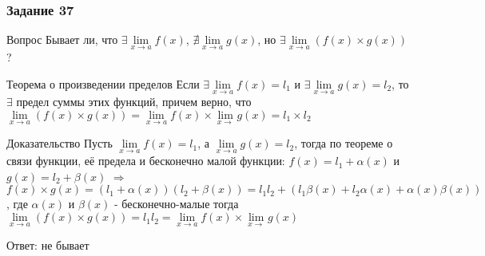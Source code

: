 \documentclass[8pt]{beamer}
\begin{document}
  \begin{frame}
    \frametitle{Задание 37}

    \begin{block}{Вопрос}
      Бывает ли, что $\exists \lim\limits_{x \rightarrow a}f(x)$, $\nexists \lim\limits_{x \rightarrow a}g(x)$,
      но $\exists \lim\limits_{x \rightarrow a}(f(x) \times g(x))$?
    \end{block} \pause

    \begin{alertblock}{Теорема о произведении пределов}
      Если $\exists \lim\limits_{x \rightarrow a}f(x) = l_1$ и $\exists \lim\limits_{x \rightarrow a}g(x) = l_2$,
      то $\exists$ предел суммы этих функций, причем верно, что
      $\lim\limits_{x \rightarrow a}(f(x) \times g(x)) = \lim\limits_{x \rightarrow a}f(x) \times \lim\limits_{x \rightarrow}g(x) = l_1 \times l_2$
    \end{alertblock} \pause

    \begin{exampleblock}{Доказательство}
      Пусть $\lim\limits_{x \rightarrow a}f(x) = l_1$, а 
      $\lim\limits_{x \rightarrow a}g(x) = l_2$, тогда по теореме
      о связи функции, её предела и бесконечно малой функции:
      $f(x) = l_1 + \alpha (x)$ и $g(x) = l_2 + \beta (x)$ $\Rightarrow$
      $f(x) \times g(x) = (l_1 + \alpha (x))(l_2 + \beta (x)) = l_1l_2 + (l_1\beta(x) + l_2\alpha(x) + \alpha(x)\beta(x))$,
      где $\alpha (x)$ и $\beta (x)$
      - бесконечно-малые тогда $\lim\limits_{x \rightarrow a}(f(x) \times g(x)) = l_1l_2 = \lim\limits_{x \rightarrow a}f(x) \times \lim\limits_{x \rightarrow}g(x)$
    \end{exampleblock} \pause

    \begin{flushright}
      Ответ: не бывает
    \end{flushright}
  \end{frame}
\end{document}
